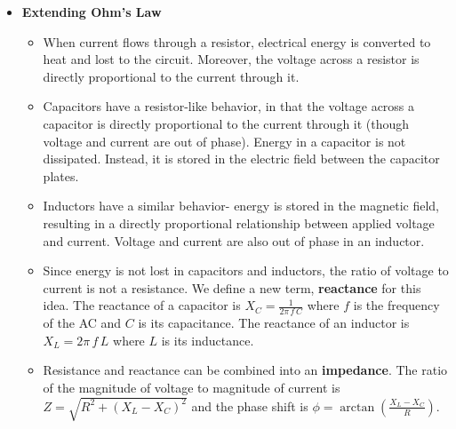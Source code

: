 \documentclass{article}
\begin{document}
\begin{itemize}
\item \textbf{Extending Ohm's Law}
  \begin{itemize}
    \item When current flows through a resistor, electrical energy is 
          converted to heat and lost to the circuit. Moreover, the voltage 
          across a resistor is directly proportional to the current through it.
    \item Capacitors have a resistor-like behavior, in that the voltage 
          across a capacitor is directly proportional to the current through it 
          (though voltage and current are out of phase). Energy in a capacitor 
          is not dissipated. Instead, it is stored in the electric field 
          between the capacitor plates.
    \item Inductors have a similar behavior- energy is stored in the magnetic 
          field, resulting in a directly proportional relationship between 
          applied voltage and current. Voltage and current are also out of phase
          in an inductor.
    \item Since energy is not lost in capacitors and inductors, the ratio of
          voltage to current is not a resistance. We define a new term,
          \textbf{reactance} for this idea. The reactance of a capacitor is
          $X_{C} = \frac{1}{2\pi\,f\,C}$ where $f$ is the frequency of the AC
          and $C$ is its capacitance. The reactance of an inductor is 
          $X_{L} = 2\pi\,f\,L$ where $L$ is its inductance.
    \item Resistance and reactance can be combined into an \textbf{impedance}.
          The ratio of the magnitude of voltage to magnitude of current is
          $Z = \sqrt{R^{2} + (X_{L} - X_{C})^{2}}$ and the phase shift is
          $\phi = \arctan \left ( \frac{X_{L}-X_{C}}{R} \right )$.
  \end{itemize}

\end{itemize}
\end{document}
